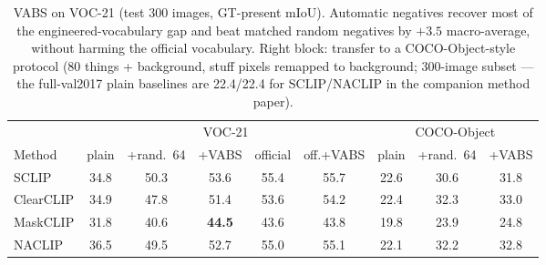 \documentclass[11pt]{article}
\newcommand{\miou}{mIoU}
\begin{document}
\begin{table}[t]
\centering\small
\caption{VABS on VOC-21 (test 300 images, GT-present \miou{}). Automatic negatives
recover most of the engineered-vocabulary gap and beat matched random negatives by
$+3.5$ macro-average, without harming the official vocabulary. Right block:
transfer to a COCO-Object-style protocol (80 things + background, stuff pixels
remapped to background; 300-image subset --- the full-val2017 plain baselines
are 22.4/22.4 for SCLIP/NACLIP in the companion method paper).}
\label{tab:vabs}
\begin{tabular}{lccccc@{\hspace{1.5em}}ccc}
\toprule
& \multicolumn{5}{c}{VOC-21} & \multicolumn{3}{c}{COCO-Object} \\
\cmidrule(r{1.5em}){2-6}\cmidrule{7-9}
Method & plain & +rand.\ 64 & +VABS & official & off.+VABS & plain & +rand.\ 64 & +VABS \\
\midrule
SCLIP     & 34.8 & 50.3 & 53.6 & 55.4 & 55.7 & 22.6 & 30.6 & 31.8 \\
ClearCLIP & 34.9 & 47.8 & 51.4 & 53.6 & 54.2 & 22.4 & 32.3 & 33.0 \\
MaskCLIP  & 31.8 & 40.6 & \textbf{44.5} & 43.6 & 43.8 & 19.8 & 23.9 & 24.8 \\
NACLIP    & 36.5 & 49.5 & 52.7 & 55.0 & 55.1 & 22.1 & 32.2 & 32.8 \\
\bottomrule
\end{tabular}
\end{table}
\end{document}

